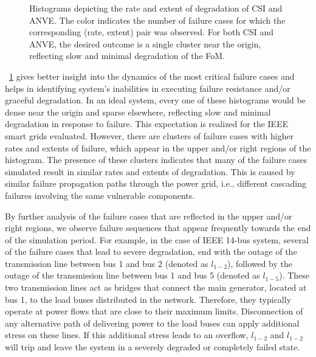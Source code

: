 \documentclass[review]{elsarticle}
\begin{document}
\begin{figure}[!ht]
\caption{Histograms depicting the rate and extent of degradation of CSI and ANVE. The color indicates the number of failure cases for which the corresponding (rate, extent) pair was observed. For both CSI and ANVE, the desired outcome is a single cluster near the origin, reflecting slow and minimal degradation of the FoM.}
\label{fig:csi_anve_rate_extent_hist}
\end{figure}

\figurename~\ref{fig:csi_anve_rate_extent_hist} gives better insight into the dynamics of the most critical failure cases and helps in identifying system's inabilities in executing failure resistance and/or graceful degradation. In an ideal system, every one of these histograms would be dense near the origin and sparse elsewhere, reflecting slow and minimal degradation in response to failure. This expectation is realized for the IEEE smart grids evaluated. However, there are clusters of failure cases with higher rates and extents of failure, which appear in the upper and/or right regions of the histogram. The presence of these clusters indicates that many of the failure cases simulated result in similar rates and extents of degradation. This is caused by similar failure propagation paths through the power grid, i.e., different cascading failures involving the same vulnerable components.

By further analysis of the failure cases that are reflected in the upper and/or right regions, we observe failure sequences that appear frequently towards the end of the simulation period. For example, in the case of IEEE 14-bus system, several of the failure cases that lead to severe degradation, end with the outage of the transmission line between bus 1 and bus 2 (denoted as $l_{1-2}$), followed by the outage of the transmission line between bus 1 and bus 5 (denoted as $l_{1-5}$). These two transmission lines act as bridges that connect the main generator, located at bus 1, to the load buses distributed in the network. Therefore, they typically operate at power flows that are close to their maximum limits. Disconnection of any alternative path of delivering power to the load buses can apply additional stress on these lines. If this additional stress leads to an overflow, $l_{1-2}$ and $l_{1-2}$ will trip and leave the system in a severely degraded or completely failed state.
\end{document}
